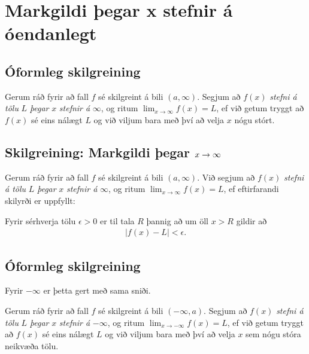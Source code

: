 \documentclass[b5paper,11pt,icelandic]{sphinxmanual}
\begin{document}
\section{Markgildi þegar x stefnir á óendanlegt}
\label{kafli02:markgildi-egar-x-stefnir-a-oendanlegt}


\subsection{Óformleg skilgreining}
\label{kafli02:id4}\label{kafli02:index-4}
Gerum ráð fyrir að fall \(f\) sé skilgreint á bili
\((a, \infty)\). Segjum að \(f(x)\) \emph{stefni á tölu} \(L\)
\emph{þegar} \(x\) \emph{stefnir á} \(\infty\), og ritum
\(\lim_{x\rightarrow \infty} f(x)=L\), ef við getum tryggt að
\(f(x)\) sé eins nálægt \(L\) og við viljum bara með því að
velja \(x\) nógu stórt.


\subsection{Skilgreining: Markgildi þegar \protect\(x \to \infty\protect\)}
\label{kafli02:skilgreining-markgildi-egar}
Gerum ráð fyrir að fall \(f\) sé skilgreint á bili
\((a,\infty)\). Við segjum að \(f(x)\) \emph{stefni á tölu} \(L\)
\emph{þegar} \(x\) \emph{stefnir á} \(\infty\), og ritum
\(\lim_{x\rightarrow \infty} f(x)=L\), ef eftirfarandi skilyrði er
uppfyllt:

Fyrir sérhverja tölu \(\epsilon>0\) er til tala \(R\)
þannig að um öll \(x>R\) gildir að
\begin{equation*}
\begin{split}|f(x)-L|<\epsilon.\end{split}
\end{equation*}

\subsection{Óformleg skilgreining}
\label{kafli02:id5}
Fyrir \(-\infty\) er þetta gert með sama sniði.

Gerum ráð fyrir að fall \(f\) sé skilgreint á bili
\((-\infty, a)\). Segjum að \(f(x)\) \emph{stefni á tölu} \(L\)
\emph{þegar} \(x\) \emph{stefnir á} \(-\infty\), og ritum
\(\lim_{x\rightarrow -\infty} f(x)=L\), ef við getum tryggt að
\(f(x)\) sé eins nálægt \(L\) og við viljum bara með því að
velja \(x\) sem nógu stóra neikvæða tölu.
\end{document}
